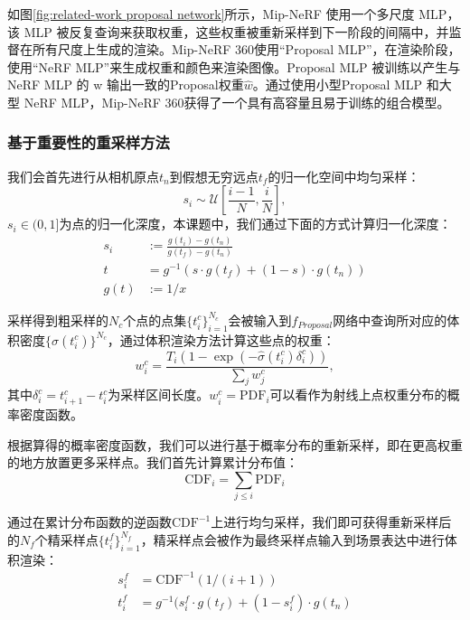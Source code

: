如图\ref{fig:related-work proposal network}所示，Mip-NeRF 使用一个多尺度 MLP，该 MLP 被反复查询来获取权重，这些权重被重新采样到下一阶段的间隔中，并监督在所有尺度上生成的渲染。Mip-NeRF 360使用“Proposal MLP”，在渲染阶段，使用“NeRF MLP”来生成权重和颜色来渲染图像。Proposal MLP 被训练以产生与 NeRF MLP 的 w 输出一致的Proposal权重$\hat{w}$。通过使用小型Proposal MLP 和大型 NeRF MLP，Mip-NeRF 360获得了一个具有高容量且易于训练的组合模型。

\subsubsection{基于重要性的重采样方法}

我们会首先进行从相机原点$t_n$到假想无穷远点$t_f$的归一化空间中均匀采样：
\begin{equation}
    s_i\sim\mathcal{U}\left[\frac{i-1}{N}, \frac{i}{N}\right],
\end{equation}
$s_i\in(0,1]$为点的归一化深度，本课题中，我们通过下面的方式计算归一化深度：
\begin{align}
    s_i&:=\frac{g(t_i)-g(t_n)}{g(t_f)-g(t_n)}\\
    t&=g^{-1}(s\cdot g(t_f) + (1-s)\cdot g(t_n))\\
    g(t)&:= 1/x
\end{align}

采样得到粗采样的$N_c$个点的点集$\{t_i^c\}_{i=1}^{N_c}$会被输入到$f_{Proposal}$网络中查询所对应的体积密度$\{\hat{\sigma}(t_i^c)\}^{N_c}$，通过体积渲染方法计算这些点的权重：
\begin{equation}
    w_i^c = \frac{T_i(1-\exp(-\hat{\sigma}(t_i^c)\delta_i^c))}{\sum_j w_j^c},
\end{equation}
其中$\delta_i^c = t_{i+1}^c - t_i^c$为采样区间长度。$w_i^c = \text{PDF}_i$可以看作为射线上点权重分布的概率密度函数。

根据算得的概率密度函数，我们可以进行基于概率分布的重新采样，即在更高权重的地方放置更多采样点。我们首先计算累计分布值：
\begin{equation}
    \text{CDF}_i = \sum_{j \leq i} \text{PDF}_i
\end{equation}

通过在累计分布函数的逆函数$\text{CDF}^{-1}$上进行均匀采样，我们即可获得重新采样后的$N_f$个精采样点$\{t_i^f\}_{i=1}^{N_f}$，精采样点会被作为最终采样点输入到场景表达中进行体积渲染：
\begin{align}
    s^f_i &= \text{CDF}^{-1}(1/(i + 1))\\
    t^f_i &= g^{-1}(s^f_i\cdot g(t_f) + (1-s^f_i)\cdot g(t_n)
\end{align}

